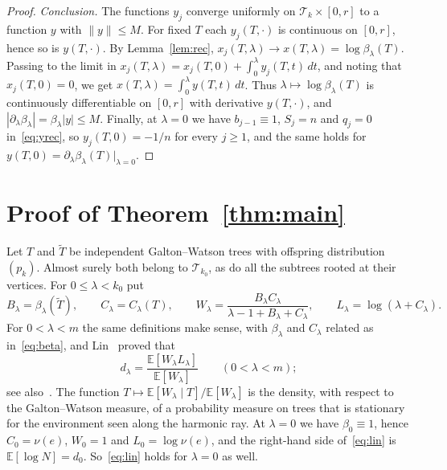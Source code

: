 \documentclass[11pt]{amsart}
\theoremstyle{definition}
\newcommand{\E}{\mathbb{E}}
\newcommand{\cT}{\mathcal{T}}
\begin{document}
\begin{proof}
\emph{Conclusion.} The functions $y_j$ converge uniformly on $\cT_k\times[0,r]$ to a function $y$ with
$\|y\|\le M$. For fixed $T$ each $y_j(T,\cdot)$ is continuous on $[0,r]$, hence so is $y(T,\cdot)$. By
Lemma~\ref{lem:rec}, $x_j(T,\lambda)\to x(T,\lambda)=\log\beta_\lambda(T)$. Passing to the limit in
$x_j(T,\lambda)=x_j(T,0)+\int_0^\lambda y_j(T,t)\,dt$, and noting that $x_j(T,0)=0$, we get
$x(T,\lambda)=\int_0^\lambda y(T,t)\,dt$. Thus $\lambda\mapsto\log\beta_\lambda(T)$ is continuously
differentiable on $[0,r]$ with derivative $y(T,\cdot)$, and
$|\partial_\lambda\beta_\lambda|=\beta_\lambda|y|\le M$. Finally, at $\lambda=0$ we have $b_{j-1}\equiv1$,
$S_j=n$ and $q_j=0$ in~\eqref{eq:yrec}, so $y_j(T,0)=-1/n$ for every $j\ge1$, and the same holds for
$y(T,0)=\partial_\lambda\beta_\lambda(T)|_{\lambda=0}$.
\end{proof}

\section{Proof of Theorem~\ref{thm:main}}\label{sec:proof}

Let $T$ and $\tilde T$ be independent Galton--Watson trees with offspring distribution $(p_k)$. Almost surely both
belong to $\cT_{k_0}$, as do all the subtrees rooted at their vertices. For $0\le\lambda<k_0$ put
\[
   B_\lambda=\beta_\lambda(\tilde T),\qquad C_\lambda=C_\lambda(T),\qquad
   W_\lambda=\frac{B_\lambda C_\lambda}{\lambda-1+B_\lambda+C_\lambda},\qquad L_\lambda=\log(\lambda+C_\lambda).
\]
For $0<\lambda<m$ the same definitions make sense, with $\beta_\lambda$ and $C_\lambda$ related as
in~\eqref{eq:beta}, and Lin~\cite[formulas (7) and (8) and the display that follows (9)]{Lin} proved that
\begin{equation}\label{eq:lin}
   d_\lambda=\frac{\E[W_\lambda L_\lambda]}{\E[W_\lambda]}\qquad(0<\lambda<m);
\end{equation}
see also~\cite[Theorem~4.1]{Rousselin}. The function $T\mapsto\E[W_\lambda\mid T]/\E[W_\lambda]$ is the density,
with respect to the Galton--Watson measure, of a probability measure on trees that is stationary for the
environment seen along the harmonic ray. At $\lambda=0$ we have $\beta_0\equiv1$, hence $C_0=\nu(e)$, $W_0=1$ and
$L_0=\log\nu(e)$, and the right-hand side of~\eqref{eq:lin} is $\E[\log N]=d_0$. So~\eqref{eq:lin} holds for
$\lambda=0$ as well.
\end{document}
